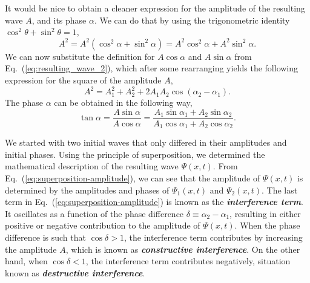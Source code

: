 It would be nice to obtain a cleaner expression for the amplitude of the resulting wave $A$, and its phase $\alpha$.
We can do that by using the trigonometric identity $\cos^2\theta + \sin^2\theta=1$,
\begin{equation}
    A^2 = A^2 (\cos^2\alpha + \sin^2\alpha) = A^2\cos^2\alpha + A^2 \sin^2\alpha.
\end{equation}
We can now substitute the definition for $A\cos\alpha$ and $A\sin\alpha$ from Eq.~(\ref{eq:resulting_wave_2}), which after some rearranging yields the following expression for the square of the amplitude $A$,
\begin{equation}
    A^2 = A_1^2 + A_2^2 + 2 A_1 A_2 \cos(\alpha_2-\alpha_1).
    \label{eq:superposition-amplitude}
\end{equation}
The phase $\alpha$ can be obtained in the following way,
\begin{equation}
    \tan \alpha = \frac{A\sin\alpha}{A\cos\alpha} = \frac{A_1\sin\alpha_1 + A_2\sin\alpha_2}{A_1\cos\alpha_1 + A_2\cos\alpha_2}.
    \label{eq:superposition-alpha}
\end{equation}

We started with two initial waves that only differed in their amplitudes and initial phases.
Using the principle of superposition, we determined the mathematical description of the resulting wave $\Psi(x,t)$.
From Eq.~(\ref{eq:superposition-amplitude}), we can see that the amplitude of $\Psi(x,t)$ is determined by the amplitudes and phases of $\Psi_1(x,t)$ and $\Psi_2(x,t)$.
The last term in Eq.~(\ref{eq:superposition-amplitude}) is known as the \textbf{\emph{interference term}}.
It oscillates as a function of the phase difference $\delta\equiv\alpha_2 - \alpha_1$, resulting in either positive or negative contribution to the amplitude of $\Psi(x,t)$.
When the phase difference is such that $\cos\delta>1$, the interference term contributes by increasing the amplitude $A$, which is known as \textbf{\emph{constructive interference}}.
On the other hand, when $\cos\delta<1$, the interference term contributes negatively, situation known as \textbf{\emph{destructive interference}}.

